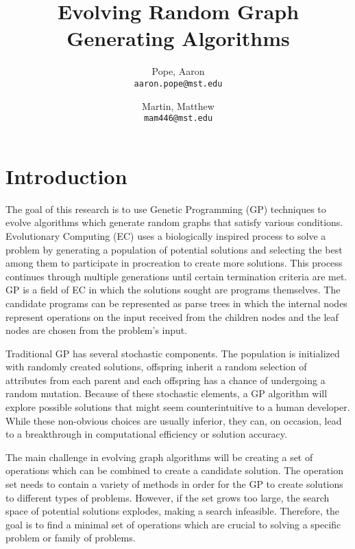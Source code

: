 \documentclass{article}
\begin{document}
\title{Evolving Random Graph Generating Algorithms}

\author{
Pope, Aaron\\
\texttt{aaron.pope@mst.edu}
\and
Martin, Matthew\\
\texttt{mam446@mst.edu}
}

\maketitle

\section{Introduction}

The goal of this research is to use Genetic Programming (GP) techniques to evolve algorithms which generate random graphs that satisfy various conditions. Evolutionary Computing (EC) uses a biologically inspired process to solve a problem by generating a population of potential solutions and selecting the best among them to participate in procreation to create more solutions. This process continues through multiple generations until certain termination criteria are met. GP is a field of EC in which the solutions sought are programs themselves. The candidate programs can be represented as parse trees in which the internal nodes represent operations on the input received from the children nodes and the leaf nodes are chosen from the problem's input.

Traditional GP has several stochastic components. The population is initialized with randomly created solutions, offspring inherit a random selection of attributes from each parent and each offspring has a chance of undergoing a random mutation. Because of these stochastic elements, a GP algorithm will explore possible solutions that might seem counterintuitive to a human developer. While these non-obvious choices are usually inferior, they can, on occasion, lead to a breakthrough in computational efficiency or solution accuracy.

The main challenge in evolving graph algorithms will be creating a set of operations which can be combined to create a candidate solution. The operation set needs to contain a variety of methods in order for the GP to create solutions to different types of problems. However, if the set grows too large, the search space of potential solutions explodes, making a search infeasible. Therefore, the goal is to find a minimal set of operations which are crucial to solving a specific problem or family of problems.
\end{document}
